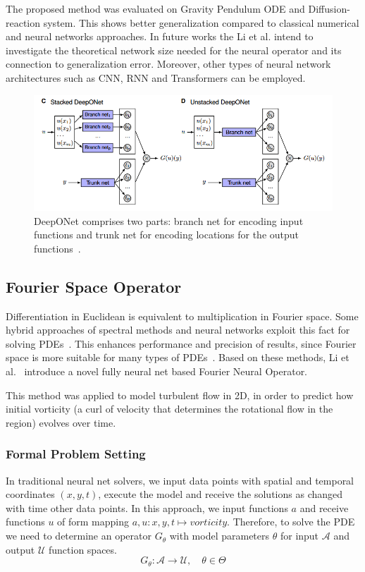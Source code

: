 The proposed method was evaluated on Gravity Pendulum ODE and Diffusion-reaction system. This shows better generalization compared to classical numerical and neural networks approaches. In future works the Li et al. intend to investigate the theoretical network size needed for the neural operator and its connection to generalization error. Moreover, other types of neural network architectures such as CNN, RNN and Transformers can be employed. 

\begin{figure}
	\centering
	\includegraphics[width=12cm]{figures/deeponet.png}
	\caption{DeepONet comprises two parts: branch net for encoding input functions and trunk net for encoding locations for the output functions~\cite{deeponet}.}
	\label{fig:deeponet}
\end{figure}  

\subsection{Fourier Space Operator}
Differentiation in Euclidean is equivalent to multiplication in Fourier space\cite{diffequimult}. Some hybrid approaches of spectral methods and neural networks exploit this fact for solving PDEs~\cite{fan19, jiang20}. This enhances performance and precision of results, since Fourier space is more suitable for many types of PDEs~\cite{fan19}. Based on these methods, Li et al.~\cite{Li20} introduce a novel fully neural net based Fourier Neural Operator. 

This method was applied to model turbulent flow in 2D, in order to predict how initial vorticity (a curl of velocity that determines the rotational flow in the region) evolves over time. 

\subsubsection{Formal Problem Setting}
In traditional neural net solvers, we input data points with spatial and temporal coordinates $(x, y, t)$, execute the model and receive the solutions as changed with time other data points. In this approach, we input functions $a$ and receive functions $u$ of form mapping $a, u: x, y, t \mapsto vorticity$. Therefore, to solve the PDE we need to determine an operator $G_{\theta}$ with model parameters $\theta$ for input $\mathcal{A}$ and output $\mathcal{U}$ function spaces.
\begin{equation}
G_{\theta}: \mathcal{A} \rightarrow \mathcal{U}, \quad \theta \in \Theta
    \label{eq:fno}
\end{equation}


